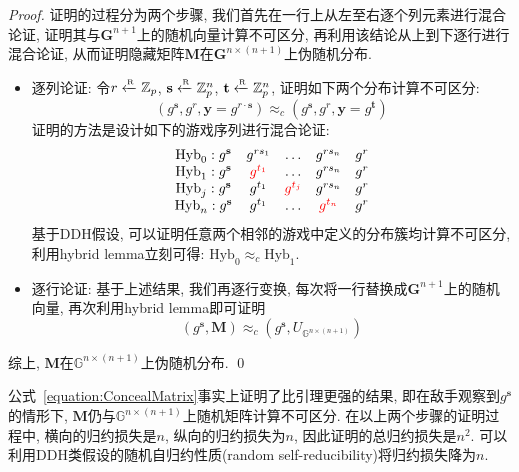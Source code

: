 \begin{proof}
证明的过程分为两个步骤, 我们首先在一行上从左至右逐个列元素进行混合论证, 证明其与$\mathbf{G}^{n+1}$上的随机向量计算不可区分, 
再利用该结论从上到下逐行进行混合论证, 从而证明隐藏矩阵$\mathbf{M}$在$\mathbf{G}^{n \times (n+1)}$上伪随机分布. 
\begin{itemize}
\item 逐列论证: 令$r \xleftarrow{\textup{\tiny R}} \mathbb{Z}_p$, $\mathbf{s} \xleftarrow{\textup{\tiny R}} \mathbb{Z}_p^n$, $\mathbf{t} \xleftarrow{\textup{\tiny R}} \mathbb{Z}_p^n$, 
	证明如下两个分布计算不可区分: 
	\begin{equation*}
    	(g^\mathbf{s}, g^r, \mathbf{y} = g^{r\cdot \mathbf{s}}) \approx_c (g^\mathbf{s}, g^r, \mathbf{y} = g^{\mathbf{t}}) 
	\end{equation*}
	证明的方法是设计如下的游戏序列进行混合论证:
\begin{displaymath}
\begin{array}{cccccc}
    \text{Hyb}_0: g^{\mathbf{s}} & g^{rs_1}      & \dots         & g^{rs_n}      & g^r\\
    \text{Hyb}_1: g^{\mathbf{s}} & {\color{red} g^{t_1}} & \dots         & g^{rs_n}      & g^r\\
    \text{Hyb}_j: g^{\mathbf{s}} & g^{t_1}       & {\color{red} g^{t_j}} & g^{rs_n}      & g^r\\
    \text{Hyb}_n: g^{\mathbf{s}} & g^{t_1}       & \dots         & {\color{red} g^{t_n}} & g^r
\end{array}
\end{displaymath}
基于DDH假设, 可以证明任意两个相邻的游戏中定义的分布簇均计算不可区分, 利用hybrid lemma立刻可得: $\text{Hyb}_0 \approx_c \text{Hyb}_1$. 

\item 逐行论证: 基于上述结果, 我们再逐行变换, 每次将一行替换成$\mathbf{G}^{n+1}$上的随机向量, 再次利用hybrid lemma即可证明
\begin{equation}\label{equation:ConcealMatrix}
    (g^\mathbf{s}, \mathbf{M}) \approx_c (g^\mathbf{s}, U_{\mathbb{G}^{n \times (n+1)}})
\end{equation}
\end{itemize}
综上, $\mathbf{M}$在$\mathbb{G}^{n \times (n+1)}$上伪随机分布. \qed
\end{proof}

\begin{remark}
公式~\eqref{equation:ConcealMatrix}事实上证明了比引理更强的结果, 即在敌手观察到$g^\mathbf{s}$的情形下, 
$\mathbf{M}$仍与$\mathbb{G}^{n \times (n+1)}$上随机矩阵计算不可区分.  
在以上两个步骤的证明过程中, 横向的归约损失是$n$, 纵向的归约损失为$n$, 因此证明的总归约损失是$n^2$. 
可以利用DDH类假设的随机自归约性质(random self-reducibility)将归约损失降为$n$. 
\end{remark}

